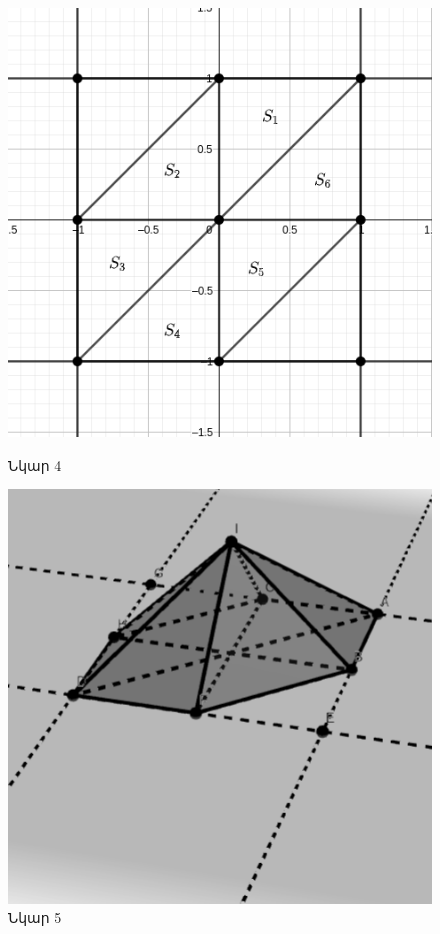 \documentclass[fleqn, bachelor,subf,12pt,notitlepage]{disser}
\begin{document}
\begin{figure}[h!]
  \centering
  \begin{minipage}[b]{0.4\textwidth}
    \includegraphics[width=\textwidth]{images/two_var_courant_1}
    \captionsetup{labelformat=empty}
    \caption{Նկար 4}
  \end{minipage}
  \hfill
  \begin{minipage}[b]{0.4\textwidth}
    \includegraphics[width=\textwidth]{images/two_var_courant_2}
    \captionsetup{labelformat=empty}
    \caption{Նկար 5}
  \end{minipage}
\end{figure}
\end{document}
